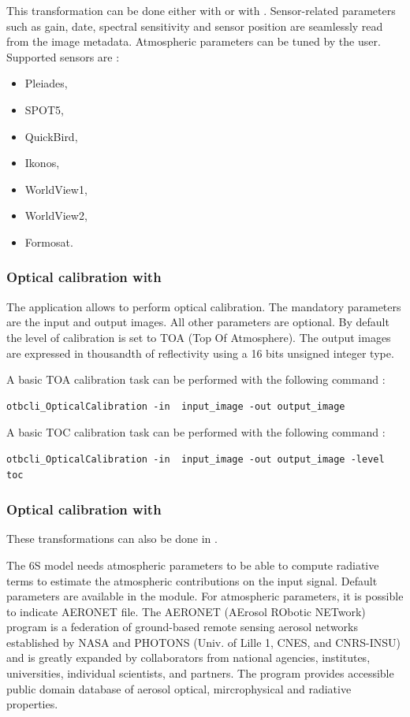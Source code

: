 This transformation can be done either with \app or with
\mont. Sensor-related parameters such as gain, date, spectral
sensitivity and sensor position are seamlessly read from the image
metadata. Atmospheric parameters can be tuned by the user. Supported
sensors are :
\begin{itemize}
\item Pleiades,
\item SPOT5,
\item QuickBird,
\item Ikonos,
\item WorldView1,
\item WorldView2,
\item Formosat.
\end{itemize}

\subsubsection{Optical calibration with \app}

The  application
allows to perform optical calibration. The mandatory
parameters are the input and output images. All other parameters are
optional. By default the level of calibration is set to TOA (Top Of 
Atmosphere).  The output images are expressed in thousandth of 
reflectivity using a 16 bits unsigned integer type.

A basic TOA calibration task can be performed with the following command :

\begin{verbatim}
otbcli_OpticalCalibration -in  input_image -out output_image
\end{verbatim}

A basic TOC calibration task can be performed with the following command :

\begin{verbatim}
otbcli_OpticalCalibration -in  input_image -out output_image -level toc
\end{verbatim}

\subsubsection{Optical calibration with \mont}

These transformations can also be done in \mont.

The 6S model needs atmospheric parameters to be able to compute
radiative terms to estimate the atmospheric contributions on the input
signal. Default parameters are available in the module.  For
atmospheric parameters, it is possible to indicate AERONET file. The
AERONET (AErosol RObotic NETwork) program is a federation of
ground-based remote sensing aerosol networks established by NASA and
PHOTONS (Univ. of Lille 1, CNES, and CNRS-INSU) and is greatly
expanded by collaborators from national agencies, institutes,
universities, individual scientists, and partners. The program
provides accessible public domain database of aerosol optical,
mircrophysical and radiative properties.

